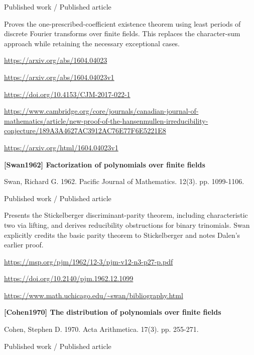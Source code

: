 \documentclass[11pt,a4paper,oneside,openany]{book}
\begin{document}
{\small\sffamily\color{atlasgold}Published work / Published article}\par
\color{black} Proves the one-prescribed-coefficient existence theorem using least periods of discrete Fourier transforms over finite fields. This replaces the character-sum approach while retaining the necessary exceptional cases.\par
{\footnotesize\url{https://arxiv.org/abs/1604.04023}}\par
{\footnotesize\url{https://arxiv.org/abs/1604.04023v1}}\par
{\footnotesize\url{https://doi.org/10.4153/CJM-2017-022-1}}\par
{\footnotesize\url{https://www.cambridge.org/core/journals/canadian-journal-of-mathematics/article/new-proof-of-the-hansenmullen-irreducibility-conjecture/189A3A4627AC3912AC76E77F6E5221E8}}\par
{\footnotesize\url{https://arxiv.org/html/1604.04023v1}}\par
\vspace{9pt}
\hypertarget{ref:Swan1962}{}
{\sffamily\bfseries\color{atlasgreen}[Swan1962] Factorization of polynomials over finite fields}\par
\color{black} Swan, Richard G. 1962. Pacific Journal of Mathematics. 12(3). pp. 1099-1106.\par
{\small\sffamily\color{atlasgold}Published work / Published article}\par
\color{black} Presents the Stickelberger discriminant-parity theorem, including characteristic two via lifting, and derives reducibility obstructions for binary trinomials. Swan explicitly credits the basic parity theorem to Stickelberger and notes Dalen's earlier proof.\par
{\footnotesize\url{https://msp.org/pjm/1962/12-3/pjm-v12-n3-p27-p.pdf}}\par
{\footnotesize\url{https://doi.org/10.2140/pjm.1962.12.1099}}\par
{\footnotesize\url{https://www.math.uchicago.edu/~swan/bibliography.html}}\par
\vspace{9pt}
\hypertarget{ref:Cohen1970}{}
{\sffamily\bfseries\color{atlasgreen}[Cohen1970] The distribution of polynomials over finite fields}\par
\color{black} Cohen, Stephen D. 1970. Acta Arithmetica. 17(3). pp. 255-271.\par
{\small\sffamily\color{atlasgold}Published work / Published article}\par
\end{document}
